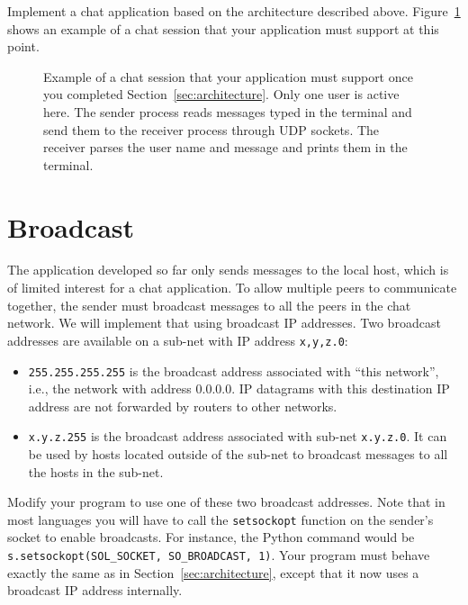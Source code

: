 \documentclass[11pt]{article}
\begin{document}
\leftpointright Implement a chat application based on the architecture
described above. Figure~\ref{fig:architecture} shows an example of a
chat session that your application must support at this point.
\begin{figure}
\caption{Example of a chat session that your application must support
  once you completed Section~\ref{sec:architecture}. Only one user is
  active here. The sender process reads messages typed in the terminal
  and send them to the receiver process through UDP sockets. The
  receiver parses the user name and message and prints them in the terminal.}
\label{fig:architecture}
\end{figure}

\section{Broadcast}
\label{sec:broadcast}
The application developed so far only sends messages to the local
host, which is of limited interest for a chat application. To allow
multiple peers to communicate together, the sender must broadcast
messages to all the peers in the chat network. We will
implement that using broadcast IP addresses. Two broadcast
addresses are available on a sub-net with IP address \texttt{x,y,z.0}:
\begin{itemize}
\item \texttt{255.255.255.255} is the broadcast address associated
  with ``this network'', i.e., the network with address 0.0.0.0. IP
  datagrams with this destination IP address are not forwarded by
  routers to other networks.
\item \texttt{x.y.z.255} is the broadcast address associated with
  sub-net \texttt{x.y.z.0}. It can be used by hosts located outside of
  the sub-net to broadcast messages to all the hosts in the sub-net.
\end{itemize}

\leftpointright Modify your program to use one of these two broadcast
addresses. Note that in most languages you will have to call the
\texttt{setsockopt} function on the sender's socket to enable
broadcasts. For instance, the Python command would be
\texttt{s.setsockopt(SOL\_SOCKET, SO\_BROADCAST, 1)}. Your program
must behave exactly the same as in Section~\ref{sec:architecture}, except that
it now uses a broadcast IP address internally. 
\end{document}
